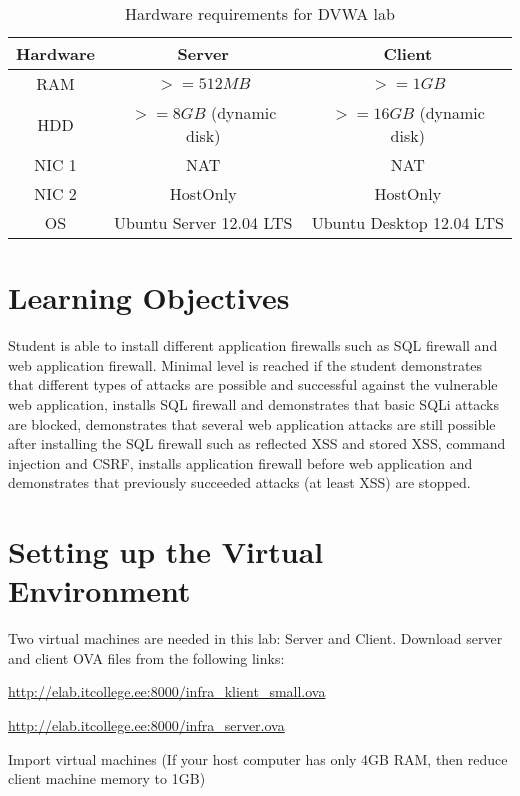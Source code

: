 \begin{table}
\centering
\caption{Hardware requirements for DVWA lab}
\begin{tabular}{|c|c|c|}
\hline 
\rule[-1ex]{0pt}{2.5ex} Hardware & Server & Client \\ 
\hline 
\rule[-1ex]{0pt}{2.5ex} RAM & $>=512MB$ & $>=1GB$\\ 
\hline
\rule[-1ex]{0pt}{2.5ex} HDD & $>=8GB$ (dynamic disk) & $>=16GB$ (dynamic disk)\\ 
\hline 
\rule[-1ex]{0pt}{2.5ex} NIC 1 & NAT  & NAT \\ 
\hline 
\rule[-1ex]{0pt}{2.5ex} NIC 2 & HostOnly & HostOnly \\ 
\hline 
\rule[-1ex]{0pt}{2.5ex} OS & Ubuntu Server 12.04 LTS & Ubuntu Desktop 12.04 LTS\\ 
\hline 
\end{tabular}
\label{table:HW for DVWA}
\end{table}

\section{Learning Objectives}

Student is able to install different application firewalls such as \gls{SQL} firewall and web application firewall. Minimal level is reached if the student demonstrates that different types of attacks are possible and successful against the vulnerable web application, installs \gls{SQL} firewall and demonstrates that basic \gls{SQLi} attacks are blocked, demonstrates that several web application attacks are still possible after installing the \gls{SQL} firewall such as reflected \gls{XSS} and stored \gls{XSS}, command injection and \gls{CSRF}, installs application firewall before web application and demonstrates that previously succeeded attacks (at least \gls{XSS}) are stopped.

\section{Setting up the Virtual Environment}

Two virtual machines are needed in this lab: Server and Client.
Download server and client \gls{OVA} files from the following links:

\url{http://elab.itcollege.ee:8000/infra_klient_small.ova}

\url{http://elab.itcollege.ee:8000/infra_server.ova}

Import virtual machines (If your host computer has only 4GB RAM, then reduce client machine memory to 1GB)

